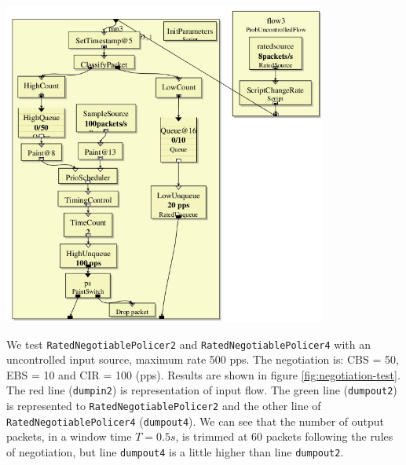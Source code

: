 \documentclass[a4paper]{article}
\begin{document}
  \begin{center}
	\includegraphics[width=0.80\textwidth]{negotiation.png}
	\label{fig:negotiation4}
  \end{center}
  We test \texttt{RatedNegotiablePolicer2} and \texttt{RatedNegotiablePolicer4} with an uncontrolled input source, maximum rate 500 pps. The negotiation is: CBS = 50, EBS = 10 and CIR = 100 (pps). Results are shown in figure \ref{fig:negotiation-test}. The red line (\texttt{dumpin2}) is representation of input flow. The green line (\texttt{dumpout2}) is represented to \texttt{RatedNegotiablePolicer2} and the other line of \texttt{RatedNegotiablePolicer4} (\texttt{dumpout4}). We can see that the number of output packets, in a window time $T = 0.5s$, is trimmed at 60 packets following the rules of negotiation, but line \texttt{dumpout4} is a little higher than line \texttt{dumpout2}.
\end{document}

